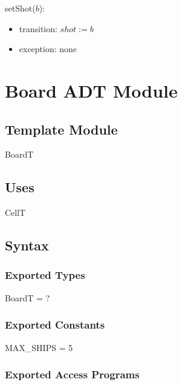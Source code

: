 \documentclass[12pt]{article}
\begin{document}
\noindent setShot($b$):
\begin{itemize}
\item transition: $shot := b$
\item exception: none
\end{itemize}

\newpage


\section {Board ADT Module}

\subsection*{Template Module}

BoardT

\subsection* {Uses}

CellT

\subsection* {Syntax}

\subsubsection* {Exported Types}

BoardT = ?

\subsubsection* {Exported Constants}

MAX\_SHIPS = 5

\subsubsection* {Exported Access Programs}
\end{document}

